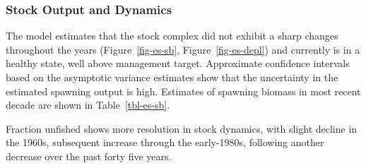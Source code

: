 \documentclass[
]{scrartcl}
\begin{document}
\subsubsection{Stock Output and
Dynamics}\label{stock-output-and-dynamics}

The model estimates that the stock complex did not exhibit a sharp
changes throughout the years (Figure~\ref{fig-es-sb},
Figure~\ref{fig-es-depl}) and currently is in a healthy state, well
above management target. Approximate confidence intervals based on the
asymptotic variance estimates show that the uncertainty in the estimated
spawning output is high. Estimates of spawning biomass in most recent
decade are shown in Table~\ref{tbl-es-sb}.

Fraction unfished shows more resolution in stock dynamics, with slight
decline in the 1960s, subsequent increase through the early-1980s,
following another decrease over the past forty five years.

\begingroup
\fontsize{9.0pt}{10.8pt}\selectfont
\end{document}
